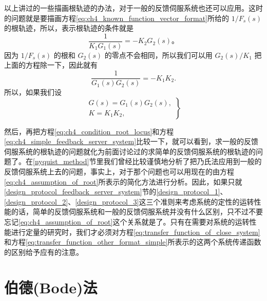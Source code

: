 以上讲过的一些描画根轨迹的办法，对于一般的反馈伺服系统也还可以应用。这时的问题就是要描画方程\eqref{eq:ch4_known_function_vector_format}所给的 $1/F_s(s)$ 的根轨迹，所以，表示根轨迹的条件就是
\begin{equation*}
\frac{1}{K_1 G_1(s)} = -K_2 G_2(s)。
\end{equation*}
因为 $1/F_s(s)$ 的根和 $G_2(s)$ 的零点不会相同，所以我们可以用 $G_2(s)/K_1$ 把上面的方程除一下，因此就有
\begin{equation}\label{eq:ch4_condition_root_locus}
\frac{1}{G_1(s) G_2(s)} = -K_1 K_2.
\end{equation}
所以，如果我们设
\begin{equation}\label{eq:ch4_assumption_of_root}
\left.
\begin{array}{l}
G(s) = G_1(s) G_2(s),\\
K = K_1 K_2, 
\end{array}
\right\}
\end{equation}

然后，再把方程\eqref{eq:ch4_condition_root_locus}和方程\eqref{eq:ch4_simple_feedback_server_system}比较一下，就可以看到，求一般的反馈伺服系统的根轨迹的问题就化为前面讨论过的求简单的反馈伺服系统的根轨迹的问题了。在\ref{nyquist_method}节里我们曾经比较谨慎地分析了把乃氏法应用到一般的反馈伺服系统上去的问题，事实上，对于那个问题也可以用现在的由方程\eqref{eq:ch4_assumption_of_root}所表示的简化方法进行分析。因此，如果只就\ref{design_protocol_feedback_server_system}节的\ref{design_protocol_1}、\ref{design_protocol_2}、\ref{design_protocol_3}这三个准则来考虑系统的定性的运转性能的话，简单的反馈伺服系统和一般的反馈伺服系统并没有什么区别，只不过不要忘记\eqref{eq:ch4_assumption_of_root}这个关系就是了。只有在需要对系统的运转性能进行定量的研究时，我们才必须对方程\eqref{eq:transfer_function_of_close_system}和方程\eqref{eq:transfer_function_other_format_simple}所表示的这两个系统传递函数的区别给予应有的注意。

\section{伯德(Bode)法}

